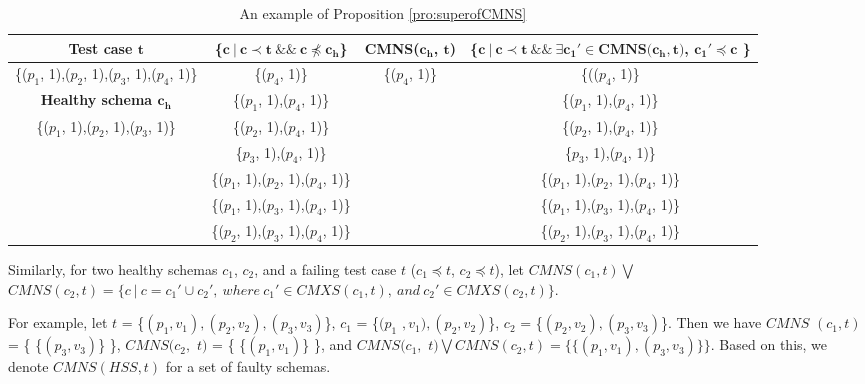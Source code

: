 {%
\begin{table}[ht]
  \centering
  \setlength{\tabcolsep}{2pt}
  \caption{An example of Proposition \ref{pro:superofCMNS}}
  {\footnotesize
    \begin{tabular}{|c|c|c|c|}
    \hline
  \textbf{  Test case $\textbf{t}$} & \textbf{ \{$\textbf{c}\ |\ \textbf{c} \prec \textbf{t}\ \&\&\ \textbf{c} \npreceq \textbf{c}_{\textbf{h}}$\} }& \textbf{ CMNS($\textbf{c}_{\textbf{h}}$, $\textbf{t}$)} & \textbf{\{$ \textbf{c}\ |\ \textbf{c} \prec \textbf{t} \ \&\& \ \exists \textbf{c}_{\textbf{1}}' \in \textbf{CMNS}\textbf{(}\textbf{c}_{\textbf{h}}, \textbf{t}\textbf{)}$, $  \textbf{c}_{\textbf{1}}' \preceq \textbf{c}$ \}}\\\hline
    \{($p_{1}$, 1),($p_{2}$, 1),($p_{3}$, 1),($p_{4}$, 1)\}  & \{($p_{4}$, 1)\} & \{($p_{4}$, 1)\} & \{(($p_{4}$, 1)\}\\ \cline{1-1}
      \textbf{Healthy schema $\textbf{c}_{\textbf{h}}$}  & \{($p_{1}$, 1),($p_{4}$, 1)\} &  & \{($p_{1}$, 1),($p_{4}$, 1)\} \\\cline{1-1}
     \{($p_{1}$, 1),($p_{2}$, 1),($p_{3}$, 1)\}         &\{($p_{2}$, 1),($p_{4}$, 1)\}  &  & \{($p_{2}$, 1),($p_{4}$, 1)\}  \\
                         &\{$p_{3}$, 1),($p_{4}$, 1)\}   &  & \{$p_{3}$, 1),($p_{4}$, 1)\}  \\
                         &\{($p_{1}$, 1),($p_{2}$, 1),($p_{4}$, 1)\}   &  & \{($p_{1}$, 1),($p_{2}$, 1),($p_{4}$, 1)\}  \\
                         &\{($p_{1}$, 1),($p_{3}$, 1),($p_{4}$, 1)\}  &  & \{($p_{1}$, 1),($p_{3}$, 1),($p_{4}$, 1)\}  \\
                         &\{($p_{2}$, 1),($p_{3}$, 1),($p_{4}$, 1)\}  &  & \{($p_{2}$, 1),($p_{3}$, 1),($p_{4}$, 1)\}  \\ \hline
    \end{tabular}}%
  \label{examleOfCMNSPro}%
\end{table}%


Similarly, for two healthy schemas $c_{1}$, $c_{2}$, and a failing test case $t$ ($c_{1} \preceq t$, $c_{2} \preceq t$), let $CMNS(c_{1}, t) \bigvee $ $CMNS(c_{2}, t)  = \{ c\ |\ c = c_{1}' \cup c_{2}',\ where\ c_{1}' \in CMXS(c_{1}, t),\ and\ c_{2}' \in CMXS(c_{2}, t) \}$.

For example, let $t$ = \{$(p_{1},v_{1}), (p_{2}, v_{2}), (p_{3}, v_{3})$\}, $c_{1}$ = \{$(p_{1}$ $, v_{1}), (p_{2}, v_{2})$\}, $c_{2}$ = \{$(p_{2}, v_{2}), (p_{3}, v_{3})$\}. Then we have $CMNS$ $(c_{1}, t)$ = \{ \{$(p_{3}, v_{3})$\} \}, $CMNS(c_{2},$ $ t)$ = \{ \{$(p_{1}, v_{1})$\} \}, and  $CMNS(c_{1},$ $ t) \bigvee CMNS(c_{2}, t) = \{ \{(p_{1}, v_{1}), (p_{3}, v_{3})\} \} $. Based on this, we denote $CMNS(HSS,t)$ for a set of faulty schemas.


}
